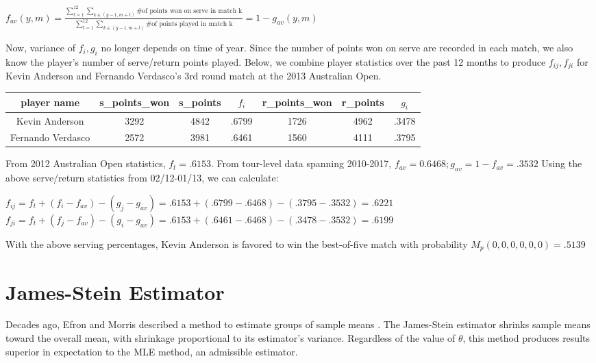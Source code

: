 \documentclass[chapterprefix=false]{report}
\begin{document}
\begin{center}
$f_{av}(y,m) = \frac{\sum_{t=1}^{12}\sum_{k \in (y-1,m+t)}{\text{\# of points won on serve in match k}}}{\sum_{t=1}^{12}\sum_{k \in (y-1,m+t)}\text{\# of points played in match k}} = 1 - g_{av}(y,m)$
\end{center}

Now, variance of $f_i,g_i$ no longer depends on time of year. Since the number of points won on serve are recorded in each match, we also know the player's number of serve/return points played. Below, we combine player statistics over the past 12 months to produce $f_{ij},f_{ji}$ for Kevin Anderson and Fernando Verdasco's 3rd round match at the 2013 Australian Open.

\begin{center}
\begin{tabular}{ |c|c|c|c|c|c|c| } 
 \hline
 player name & s\_points\_won & s\_points
&$f_i$ & r\_points\_won & r\_points & $g_i$ \\ 
 \hline
 Kevin Anderson & 3292 & 4842 & .6799 & 1726 & 4962 & .3478\\ 
 \hline
 Fernando Verdasco & 2572 & 3981 & .6461 & 1560 & 4111 & .3795\\ 
 \hline
\end{tabular}
\end{center}

From 2012 Australian Open statistics, $f_t=.6153$. From tour-level data spanning 2010-2017, $f_{av} = 0.6468; g_{av} = 1-f_{av} =.3532$ Using the above serve/return statistics from 02/12-01/13, we can calculate:

\begin{center}
$f_{ij} = f_t + (f_i-f_{av})-(g_j-g_{av}) = .6153 + (.6799-.6468) - (.3795-.3532) = .6221$
$f_{ji} = f_t + (f_j-f_{av})-(g_i-g_{av}) = .6153 + (.6461-.6468) - (.3478-.3532) = .6199$
\end{center}

With the above serving percentages, Kevin Anderson is favored to win the best-of-five match with probability $M_p(0,0,0,0,0,0) = .5139$


\section{James-Stein Estimator}
Decades ago, Efron and Morris described a method to estimate groups of sample means \cite{EfronandMorris1977}. The James-Stein estimator shrinks sample means toward the overall mean, with shrinkage proportional to its estimator's variance. Regardless of the value of $\theta$, this method produces results superior in expectation to the MLE method, an admissible estimator.
\end{document}
